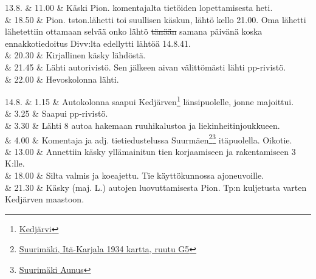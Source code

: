 \documentclass[11pt,a5paper,oneside]{book}
\begin{document}
13.8. & 11.00 & Käski Pion. komentajalta tietöiden lopettamisesta heti. \newline \\

& 18.50 & Pion. tston.lähetti toi suullisen käskun, lähtö kello 21.00. Oma lähetti lähetettiin ottamaan selvää onko lähtö \sout{tänään} samana päivänä koska ennakkotiedoitus Divv:lta edellytti lähtöä 14.8.41. \\

& 20.30 & Kirjallinen käsky lähdöstä. \\

& 21.45 & Lähti autorivistö. Sen jälkeen aivan välittömästi lähti pp-rivistö. \\

& 22.00 & Hevoskolonna lähti. \\

\taulustop


14.8. & 1.15 & Autokolonna saapui Kedjärven\footnote{\href{https://www.google.fi/maps/place/Ozero+Ked\%22Yarvi/@61.347179,32.4440471,15.26z/}{Kedjärvi}} länsipuolelle, jonne majoittui. \\

& 3.25 & Saapui pp-rivistö. \\

& 3.30 & Lähti 8 autoa hakemaan ruuhikalustoa ja liekinheitinjoukkueen. \\

& 4.00 & Komentaja ja adj. tietiedustelussa Suurmäen\footnote{\href{https://www.google.fi/maps/place/Bol'shiye+Gory,+Republic+of+Karelia,+Russia/}{Suurimäki, Itä-Karjala 1934 kartta, ruutu G5}}\footnote{\href{https://www.sotahistoriallisetkohteet.fi/app/sights/view/-/id/1169/country/9/area/90/s_back/1}{Suurimäki Aunus}} itäpuolella. Oikotie. \newline \\

& 13.00 & Annettiin käsky yllämainitun tien korjaamiseen ja rakentamiseen 3 K:lle. \newline \\

& 18.00 & Silta valmis ja koeajettu. \newline Tie käyttökunnossa ajoneuvoille. \newline\newline \\

& 21.30 & Käsky (maj. L.) autojen luovuttamisesta Pion. Tp:n kuljetusta varten Kedjärven maastoon. \\
\newpage
\end{document}
